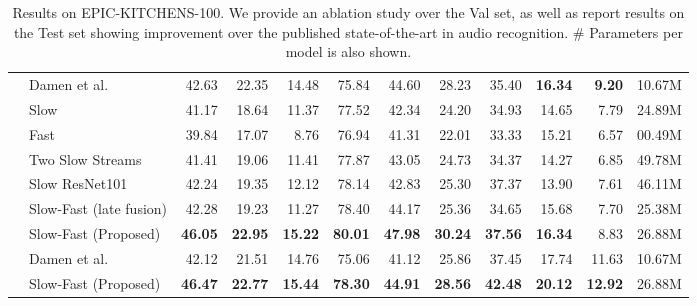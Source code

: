 \documentclass{article}
\begin{document}
\begin{table*}[t!]
{\begin{tabular}{@{}clrrrrrrrrrr@{}}
                                           & Damen et al. \cite{Damen2020RESCALING}                            																	&  42.63 & 22.35 & 14.48 & 75.84 & 44.60 & 28.23 & 35.40 & \textbf{16.34} & \textbf{9.20}   & 10.67M\\
                                           & Slow                                                                                              & 41.17 & 18.64 & 11.37 & 77.52 & 42.34 & 24.20 & 34.93 & 14.65 & 7.79  & 24.89M\\
                                           & Fast                                                                                              & 39.84 & 17.07 & 8.76 & 76.94 & 41.31 & 22.01 & 33.33 & 15.21 & 6.57 & 00.49M\\
                                           \cmidrule{2-12}
                                           & Two Slow Streams                                                                                             & 41.41 & 19.06 & 11.41 & 77.87 & 43.05 & 24.73 & 34.37 & 14.27 & 6.85 & 49.78M\\
                                            & Slow ResNet101                                                                                              & 42.24 & 19.35 & 12.12 & 78.14 & 42.83 & 25.30 & 37.37 & 13.90 & 7.61 & 46.11M\\
                                            \cmidrule{2-12}
                                           & Slow-Fast (late fusion) & 42.28 & 19.23 & 11.27 & 78.40 & 44.17 & 25.36 & 34.65 & 15.68 & 7.70 & 25.38M\\
            								& Slow-Fast (Proposed)                                                                                   & \textbf{46.05} & \textbf{22.95} & \textbf{15.22} & \textbf{80.01} & \textbf{47.98} & \textbf{30.24} & \textbf{37.56} & \textbf{16.34} & 8.83 & 26.88M\\
                                            \cmidrule{1-12} \morecmidrules \cmidrule{1-12}
\multirow{2}{*}{\rotatebox{90}{\textbf{Test}}}

                                           & Damen et al. \cite{Damen2020RESCALING}																								& 42.12 & 21.51 & 14.76 & 75.06 & 41.12 & 25.86 & 37.45 & 17.74 & 11.63 & 10.67M\\
                                           & Slow-Fast (Proposed)                                                                                   & \textbf{46.47} & \textbf{22.77} & \textbf{15.44} & \textbf{78.30} & \textbf{44.91} & \textbf{28.56} & \textbf{42.48} & \textbf{20.12} & \textbf{12.92} & 26.88M\\
                                          \bottomrule
\end{tabular}}
\caption{Results on EPIC-KITCHENS-100. We provide an ablation study over the Val set, as well as report results on the Test set showing improvement over the published state-of-the-art in audio recognition. \# Parameters per model is also shown.}
\vspace*{-6pt}
\label{tab:epic_res}
\end{table*}
\end{document}
